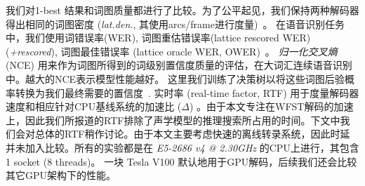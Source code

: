 
我们对1-best 结果和词图质量都进行了比较。为了公平起见，我们保持两种解码器得出相同的词图密度 ({\em{lat.den.}}, 其使用arcs/frame进行度量)~\cite{woodland19951994}。
在语音识别任务中，我们使用词错误率(WER), 词图重估错误率(lattice rescored WER) ({\em{+rescored}}), 词图最佳错误率 (lattice oracle WER, OWER)~\cite{hoffmeister2006frame}。
{\em 归一化交叉熵 } (NCE) \cite{zhc00-chen-icassp2017} 用来作为词图所得到的词级别置信度质量的评估，在大词汇连续语音识别中。越大的NCE表示模型性能越好。
这里我们训练了决策树以将这些词图后验概率转换为我们最终需要的置信度~\cite{chen2017confidence,chen2017unified}.
实时率 (real-time factor, RTF) 用于度量解码器速度和相应针对CPU基线系统的加速比 ($\Delta$) 。由于本文专注在WFST解码的加速上，因此我们所报道的RTF排除了声学模型的推理搜索所占用的时间。下文中我们会对总体的RTF稍作讨论。由于本文主要考虑快速的离线转录系统，因此时延并未加入比较。所有的实验都是在  {\em{E5-2686 v4 @ 2.30GHz}} 的CPU上进行，其包含 1 socket (8 threads)。 %
一块 Tesla V100 默认地用于GPU解码，后续我们还会比较其它GPU架构下的性能。


